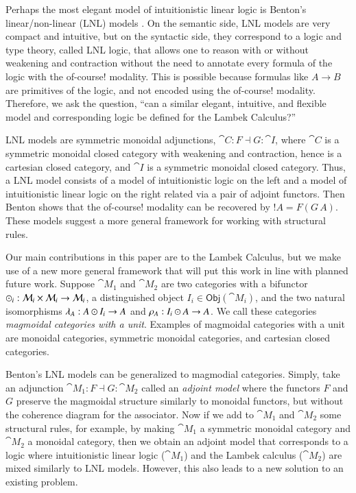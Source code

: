 Perhaps the most elegant model of intuitionistic linear logic is
Benton's linear/non-linear (LNL) models \cite{Benton:1994}. On the
semantic side, LNL models are very compact and intuitive, but on the
syntactic side, they correspond to a logic and type theory, called LNL
logic, that allows one to reason with or without weakening and
contraction without the need to annotate every formula of the logic
with the of-course!  modality.  This is possible because formulas like
$A \to B$ are primitives of the logic, and not encoded using the
of-course! modality.  Therefore, we ask the question, ``can a similar
elegant, intuitive, and flexible model and corresponding logic be
defined for the Lambek Calculus?''

LNL models are symmetric monoidal adjunctions, $\cat{C} : F \dashv G :
\cat{I}$, where $\cat{C}$ is a symmetric monoidal closed category with
weakening and contraction, hence is a cartesian closed category, and
$\cat{I}$ is a symmetric monoidal closed category.  Thus, a LNL model
consists of a model of intuitionistic logic on the left and a model of
intuitionistic linear logic on the right related via a pair of adjoint
functors.  Then Benton shows that the of-course! modality can be
recovered by $!A = F(G\,A)$.  These models suggest a more general
framework for working with structural rules.

Our main contributions in this paper are to the Lambek Calculus, but
we make use of a new more general framework that will put this work in
line with planned future work.  Suppose $\cat{M}_1$ and $\cat{M}_2$
are two categories with a bifunctor $\odot_i : \mathcal{M}_i \times
\mathcal{M}_i \rightarrow \mathcal{M}_i$, a distinguished object $I_i \in
\mathsf{Obj}(\cat{M}_i)$, and the two natural isomorphisms $\lambda_A
: A \odot I_i \rightarrow A$ and $\rho_A : I_i \odot A \rightarrow A$.  We call
these categories \emph{magmoidal categories with a unit}.  Examples of
magmoidal categories with a unit are monoidal categories, symmetric
monoidal categories, and cartesian closed categories.

Benton's LNL models can be generalized to magmodial categories.
Simply, take an adjunction $\cat{M}_1 : F \dashv G : \cat{M}_2$ called
an \emph{adjoint model} where the functors $F$ and $G$ preserve the
magmoidal structure similarly to monoidal functors, but without the
coherence diagram for the associator.  Now if we add to $\cat{M}_1$
and $\cat{M}_2$ some structural rules, for example, by making
$\cat{M}_1$ a symmetric monoidal category and $\cat{M}_2$ a monoidal
category, then we obtain an adjoint model that corresponds to a logic
where intuitionistic linear logic ($\cat{M}_1$) and the Lambek
calculus ($\cat{M}_2$) are mixed similarly to LNL models.  However,
this also leads to a new solution to an existing problem.

